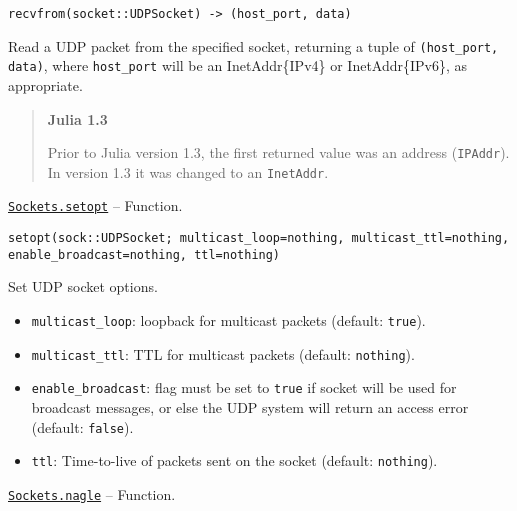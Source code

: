\begin{adjustwidth}{2em}{0pt}


\begin{verbatim}
recvfrom(socket::UDPSocket) -> (host_port, data)
\end{verbatim}

Read a UDP packet from the specified socket, returning a tuple of \texttt{(host\_port, data)}, where \texttt{host\_port} will be an InetAddr\{IPv4\} or InetAddr\{IPv6\}, as appropriate.

\begin{quote}
\textbf{Julia 1.3}

Prior to Julia version 1.3, the first returned value was an address (\texttt{IPAddr}). In version 1.3 it was changed to an \texttt{InetAddr}.

\end{quote}


\end{adjustwidth}
\hypertarget{16113505891345104473}{} 
\hyperlink{16113505891345104473}{\texttt{Sockets.setopt}}  -- {Function.}

\begin{adjustwidth}{2em}{0pt}


\begin{verbatim}
setopt(sock::UDPSocket; multicast_loop=nothing, multicast_ttl=nothing, enable_broadcast=nothing, ttl=nothing)
\end{verbatim}

Set UDP socket options.

\begin{itemize}
\item \texttt{multicast\_loop}: loopback for multicast packets (default: \texttt{true}).


\item \texttt{multicast\_ttl}: TTL for multicast packets (default: \texttt{nothing}).


\item \texttt{enable\_broadcast}: flag must be set to \texttt{true} if socket will be used for broadcast messages, or else the UDP system will return an access error (default: \texttt{false}).


\item \texttt{ttl}: Time-to-live of packets sent on the socket (default: \texttt{nothing}).

\end{itemize}


\end{adjustwidth}
\hypertarget{6421218738057495658}{} 
\hyperlink{6421218738057495658}{\texttt{Sockets.nagle}}  -- {Function.}

